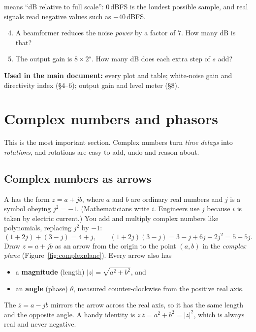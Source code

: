\documentclass[11pt]{article}
\begin{document}
 means ``dB relative to full scale'': $0$\,dBFS is the loudest possible sample,
and real signals read negative values such as $-40$\,dBFS.

\begin{checkyourself}
\begin{enumerate}[nosep]
\setcounter{enumi}{3}
\item A beamformer reduces the noise \emph{power} by a factor of 7. How many dB is that?
\item The output gain is $8\times2^s$. How many dB does each extra step of $s$ add?
\end{enumerate}
\end{checkyourself}

\begin{whereused}
\textbf{Used in the main document:} every plot and table; white-noise gain and directivity index
(\S4--6); output gain and level meter (\S8).
\end{whereused}

\section{Complex numbers and phasors}\label{sec:complex}

This is the most important section. Complex numbers turn \emph{time delays} into
\emph{rotations}, and rotations are easy to add, undo and reason about.

\subsection{Complex numbers as arrows}

A  has the form $z=a+jb$, where $a$ and $b$ are ordinary real numbers
and $j$ is a symbol obeying $j^2=-1$. (Mathematicians write $i$. Engineers use $j$ because $i$ is
taken by electric current.) You add and multiply complex numbers like polynomials, replacing $j^2$
by $-1$:
\[
  (1+2j)+(3-j)=4+j,\qquad (1+2j)(3-j)=3-j+6j-2j^2=5+5j.
\]
Draw $z=a+jb$ as an arrow from the origin to the point $(a,b)$ in the \emph{complex plane}
(Figure~\ref{fig:complexplane}). Every arrow also has
\begin{itemize}[nosep]
\item a \textbf{magnitude} (length) $|z|=\sqrt{a^2+b^2}$, and
\item an \textbf{angle} (phase) $\theta$, measured counter-clockwise from the positive real axis.
\end{itemize}
The  $\overline z=a-jb$ mirrors the arrow across the real axis, so it
has the same length and the opposite angle. A handy identity is $z\,\overline z=a^2+b^2=|z|^2$,
which is always real and never negative.
\end{document}
